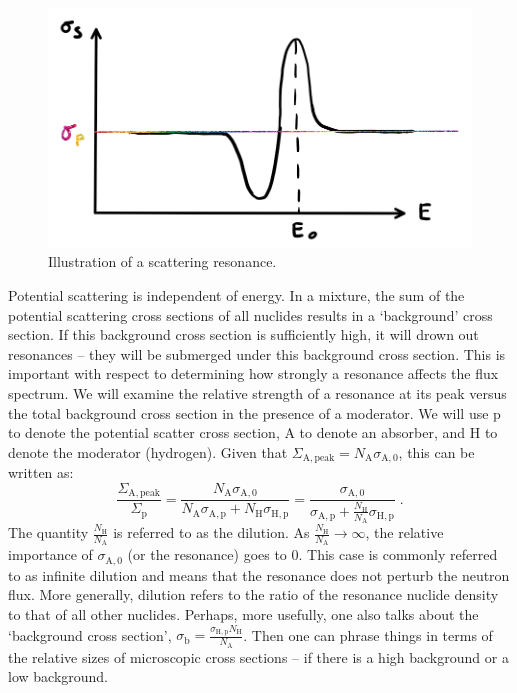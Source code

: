\begin{figure}[h]
  \centering
  \includegraphics[scale=0.60]{./Figures/P3/slbwScatter.png} 
  \caption{Illustration of a scattering resonance.} 
  \label{fig:res}
\end{figure}

Potential scattering is independent of energy. In a mixture, the sum of the potential scattering cross sections of all nuclides results in a `background' cross section. If this background cross section is sufficiently high, it will drown out resonances -- they will be submerged under this background cross section. This is important with respect to determining how strongly a resonance affects the flux spectrum. %
We will examine the relative strength of a resonance at its peak versus the total background cross section in the presence of a moderator. We will use p to denote the potential scatter cross section, A to denote an absorber, and H to denote the moderator (hydrogen). Given that $\Sigma_{\mathrm{A},\mathrm{peak}} = N_\mathrm{A}\sigma_{\mathrm{A},0}$, this can be written as:
\begin{equation*}
    \frac{\Sigma_{\mathrm{A},\mathrm{peak}}}{\Sigma_\mathrm{p}} = \frac{N_\mathrm{A}\sigma_{\mathrm{A},0}}{N_\mathrm{A}\sigma_{\mathrm{A},\mathrm{p}} + N_\mathrm{H}\sigma_{\mathrm{H},\mathrm{p}}} = \frac{\sigma_{\mathrm{A},0}}{\sigma_{\mathrm{A},\mathrm{p}} + \frac{N_\mathrm{H}}{N_\mathrm{A}}\sigma_{\mathrm{H},\mathrm{p}}}\;\mathrm{.}
\end{equation*}
The quantity $\frac{N_\mathrm{H}}{N_\mathrm{A}}$ is referred to as the dilution. As $\frac{N_\mathrm{H}}{N_\mathrm{A}}\rightarrow \infty$, the relative importance of $\sigma_{\mathrm{A},0}$ (or the resonance) goes to 0. This case is commonly referred to as infinite dilution and means that the resonance does not perturb the neutron flux. More generally, dilution refers to the ratio of the resonance nuclide density to that of all other nuclides. Perhaps, more usefully, one also talks about the `background cross section', $\sigma_\mathrm{b} = \frac{\sigma_\mathrm{H,p}N_\mathrm{H}}{N_\mathrm{A}}$. Then one can phrase things in terms of the relative sizes of microscopic cross sections -- if there is a high background or a low background.

